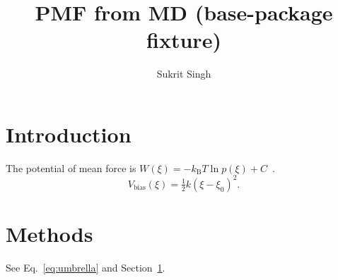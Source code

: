 \documentclass[11pt]{article}
\title{PMF from MD (base-package fixture)}
\author{Sukrit Singh}
\begin{document}
\maketitle
\section{Introduction}\label{sec:intro}
The potential of mean force is $W(\xi) = -k_\mathrm{B}T\ln p(\xi) + C$~\citep{kumar1992}.
\begin{equation}\label{eq:umbrella}
V_\mathrm{bias}(\xi)=\tfrac12 k (\xi-\xi_0)^2.
\end{equation}
\section{Methods}\label{sec:methods}
See Eq.~\eqref{eq:umbrella} and Section~\ref{sec:intro}.


\end{document}
